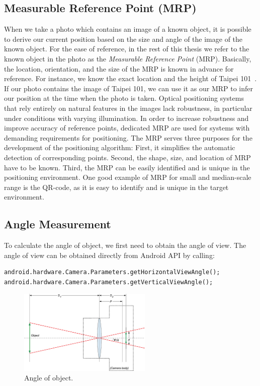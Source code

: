 \subsection{Measurable Reference Point (MRP)}
When we take a photo which contains an image of a known object, it is possible to derive our current position based on the size and angle of the image of the known object. For the ease of reference, in the rest of this thesis we refer to the known object in the photo as the \emph{Measurable Reference Point} (MRP). Basically, the location, orientation, and the size of the MRP is known in advance for reference. For instance, we know the exact location and the height of Taipei 101~\cite{wiki-taipei101}. If our photo contains the image of Taipei 101, we can use it as our MRP to infer our position at the time when the photo is taken.
Optical positioning systems that rely entirely on natural features in the images lack robustness, in particular under conditions with varying illumination. In order to increase robustness and improve accuracy of reference points, dedicated MRP are used for systems with demanding requirements for positioning. The MRP serves three purposes for the development of the positioning algorithm: First, it simplifies the automatic detection of corresponding points. Second, the shape, size, and location of MRP have to be known. Third, the MRP can be easily identified and is unique in the positioning environment. One good example of MRP for small and median-scale range is the QR-code, as it is easy to identify and is unique in the target environment.

\subsection{Angle Measurement}\label{sec-angle-measurement}
To calculate the angle of object, we first need to obtain the angle of view. The angle of view can be obtained directly from Android API by calling:
\begin{verbatim}
android.hardware.Camera.Parameters.getHorizontalViewAngle();
android.hardware.Camera.Parameters.getVerticalViewAngle();
\end{verbatim}

\begin{figure}
  \vspace{-35pt}
  \begin{center}
    \includegraphics[width=2.5in]{fig/fig-angle-of-view.eps}
  \end{center}
  \vspace{-20pt}
  \caption{Angle of object.}\label{fig-angle-of-view}
  \vspace{-35pt}
\end{figure}

